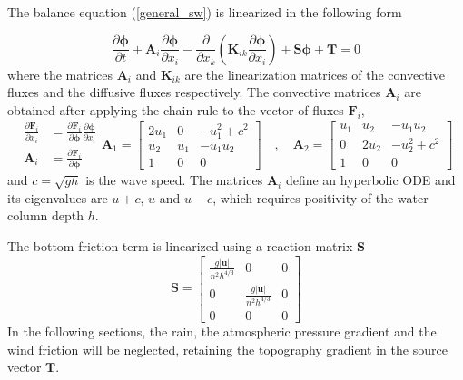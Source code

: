 \documentclass[a4paper,12pt]{article}
\newcommand{\pder}[2]{\frac{\partial#1}{\partial#2}}
\newcommand{\abs}[1]{\lvert#1\rvert}
\begin{document}
The balance equation (\ref{general_sw}) is linearized in the following form

\begin{equation}
\pder{\bm{\phi}}{t} + \mathbf{A}_i\pder{\bm{\phi}}{x_i}
 - \pder{}{x_k}\left(\mathbf{K}_{ik}\pder{\bm{\phi}}{x_i}\right) + \mathbf{S}\bm{\phi} + \mathbf{T} = 0
\end{equation}
where the matrices $\mathbf{A}_i$ and $\mathbf{K}_{ik}$ are the linearization matrices of the convective fluxes and the diffusive fluxes respectively. The convective matrices $\mathbf{A}_i$ are obtained after applying the chain rule to the vector of fluxes $\mathbf{F}_i$,
\begin{subequations}
\begin{align}
\pder{\mathbf{F}_i}{x_i} &= \pder{\mathbf{F}_i}{\bm{\phi}}\pder{\bm{\phi}}{x_i} \\
\mathbf{A}_i &= \pder{\mathbf{F}_i}{\bm{\phi}}
\end{align}
\begin{equation}
\mathbf{A}_1 = \left[\begin{matrix}
        2u_1 & 0   & -u_1^2 + c^2 \\
        u_2  & u_1 & -u_1 u_2 \\
        1    & 0   & 0
    \end{matrix} \right]
\quad , \quad
\mathbf{A}_2 = \left[\begin{matrix}
        u_1 & u_2  & -u_1 u_2 \\
        0   & 2u_2 & -u_2^2 + c^2 \\
        1   & 0    & 0
    \end{matrix} \right]
\end{equation}
\end{subequations}
and $c=\sqrt{gh}$ is the wave speed. The matrices $\mathbf{A}_i$ define an hyperbolic ODE and its eigenvalues are $u+c$, $u$ and $u-c$, which requires positivity of the water column depth $h$.

The bottom friction term is linearized using a reaction matrix $\mathbf{S}$
\begin{equation}
\mathbf{S} = \left[\begin{matrix}
    \frac{g\abs{\mathbf{u}}}{n^2h^{4/3}} & 0 & 0 \\
    0 & \frac{g\abs{\mathbf{u}}}{n^2h^{4/3}} & 0 \\
    0 & 0 & 0
\end{matrix}\right]
\end{equation}
In the following sections, the rain, the atmospheric pressure gradient and the wind friction will be neglected, retaining the topography gradient in the source vector $\mathbf{T}$.
\end{document}
